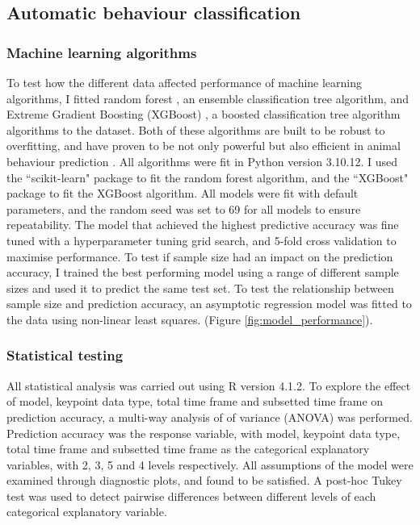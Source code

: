 \documentclass[11pt, letterpaper]{article} %
\begin{document}
    \subsection{Automatic behaviour classification}

        \subsubsection{Machine learning algorithms}
        To test how the different data affected performance of machine learning algorithms, I fitted random forest \citep{breiman_randomforest_2001}, an ensemble classification tree algorithm, and Extreme Gradient Boosting (XGBoost) \citep{chen_xgboost_2016}, a boosted classification tree algorithm algorithms to the dataset. Both of these algorithms are built to be robust to overfitting, and have proven to be not only powerful but also efficient in animal behaviour prediction \citep{rf_vs_xg_2019}. 
        All algorithms were fit in Python version 3.10.12. I used the ``scikit-learn" package \citep{scikit-learn} to fit the random forest algorithm, and the ``XGBoost" package to fit the XGBoost algorithm. All models were fit with default parameters, and the random seed was set to 69 for all models to ensure repeatability. The model that achieved the highest predictive accuracy was fine tuned  with a hyperparameter tuning grid search, and 5-fold cross validation to maximise performance. To test if sample size had an impact on the prediction accuracy, I trained the best performing model using a range of different sample sizes and used it to predict the same test set. To test the relationship between sample size and prediction accuracy, an asymptotic regression model was fitted to the data using non-linear least squares. (Figure \ref{fig:model_performance}).

        \subsubsection{Statistical testing}
        All statistical analysis was carried out using R version 4.1.2.
        To explore the effect of model, keypoint data type, total time frame and subsetted time frame on prediction accuracy, a multi-way analysis of of variance (ANOVA) was performed. Prediction accuracy was the response variable, with model, keypoint data type, total time frame and subsetted time frame as the categorical explanatory variables, with 2, 3, 5 and 4 levels respectively. All assumptions of the model were examined through diagnostic plots, and found to be satisfied. A post-hoc Tukey test was used to detect pairwise differences between different levels of each categorical explanatory variable. 
\end{document}
